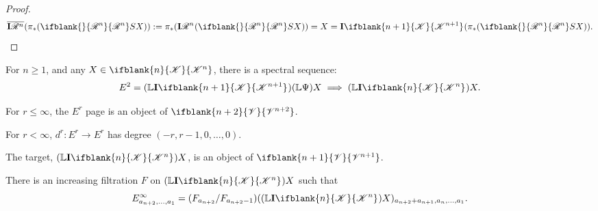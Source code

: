 \documentclass[10pt]{article}
\newcommand{\GS}[1]{\scrE^{#1}}
\newcommand{\PRLie}[1]{\scrR^{#1}}%
\newcommand{\LL}[1]{\ifblank{#1}{\scrK}{\scrK^{#1}}}
\newcommand{\GR}[1]{\ifblank{#1}{\scrV}{\scrV^{#1}}}
\newcommand{\nontop}[1]{\ifblank{#1}{\scrU}{\scrU^{#1}}}
\newcommand{\PiAlg}[1]{#1\textup{-$\Pi$-alg}}
\newcommand{\Ind}[2][]{\mathbf{I}{#2}_{#1}}%
\newcommand{\Fr}[2][]{\ifblank{#1}{#2}{#2_{#1}}}
\newcommand{\derived}{\mathbb{L}}
\begin{document}
\begin{GrothendieckSpectralSequences}
\begin{proof}
\[\overline{\Ind{\PRLie{n}}}(\pi_*(\Fr{\PRLie{n}}SX)):=\pi_*(\Ind{\PRLie{n}}(\Fr{\PRLie{n}}SX))=X=\Ind{\LL{n+1}}(\pi_*(\Fr{\PRLie{n}}SX)).\qedhere\]
\end{proof}
\begin{cor}
For $n\geq1$, and any $X\in\LL{n}$, there is a spectral sequence:
\[E^2=(\derived{\Ind{\LL{n+1}}})(\derived\Psi)X\implies(\derived\Ind{\LL{n}})X.\]
\begin{itemise}
\setlength{\parindent}{.25in}
\item For $r\leq\infty$, the $E^r$ page is an object of $\GR{n+2}$.
\item For $r<\infty$, $d^r:E^r\to E^r$ has degree $(-r,r-1,0,\ldots,0)$.
\item The target, $(\derived\Ind{\LL{n}})X$, is an object of $\GR{n+1}$.
\item There is an increasing filtration $F$ on $(\derived\Ind{\LL{n}})X$ such that
\[E^\infty_{a_{n+2},\ldots,a_1}=(F_{a_{n+2}}/F_{a_{n+2}-1})((\derived\Ind{\LL{n}})X)_{a_{n+2}+a_{n+1},a_n,\ldots,a_1}.\]
\end{itemise}
\end{cor}




\end{GrothendieckSpectralSequences}
\end{document}
